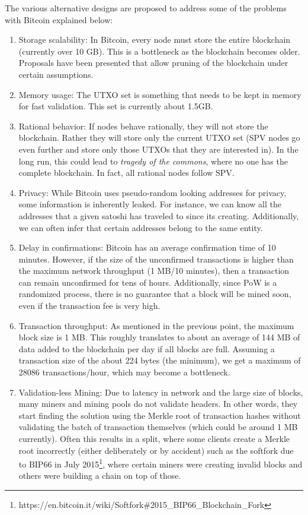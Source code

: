 \documentclass[]{report}   %
\begin{document}
The various alternative designs are proposed to address some of the problems with Bitcoin explained below:
\begin{enumerate}
	\item Storage scalability: In Bitcoin, every node must store the entire blockchain (currently over 10 GB). This is a bottleneck as the blockchain becomes older. Proposals have been presented that allow pruning of the blockchain under certain assumptions. 
	\item Memory usage: The UTXO set is something that needs to be kept in memory for fast validation. This set is currently about 1.5GB.
	\item Rational behavior: If nodes behave rationally, they will not store the blockchain. Rather they will store only the current UTXO set (SPV nodes go even further and store only those UTXOs that they are interested in). In the long run, this could lead to {\em tragedy of the commons}, where no one has the complete blockchain. In fact, all rational nodes follow SPV.
	\item Privacy: While Bitcoin uses pseudo-random looking addresses for privacy, some information is inherently leaked. For instance, we can know all the addresses that a given satoshi has traveled to since its creating. Additionally, we can often infer that certain addresses belong to the same entity.
	\item Delay in confirmations: Bitcoin has an average confirmation time of 10 minutes. However, if the size of the unconfirmed transactions is higher than the maximum network throughput (1 MB/10 minutes), then a transaction can remain unconfirmed for tens of hours. Additionally, since PoW is a randomized process, there is no guarantee that a block will be mined soon, even if the transaction fee is very high.
	\item Transaction throughput: As mentioned in the previous point, the maximum block size is 1 MB. This roughly translates to about an average of 144 MB of data added to the blockchain per day if all blocks are full. Assuming a transaction size of the about 224 bytes (the minimum), we get a maximum of 28086 transactions/hour, which may become a bottleneck. %
	\item Validation-less Mining: Due to latency in network and the large size of blocks, many miners and mining pools do not validate headers. In other words, they start finding the solution using the Merkle root of transaction hashes without validating the batch of transaction themselves (which could be around 1 MB currently). Often this results in a split, where some clients create a Merkle root incorrectly (either deliberately or by accident) such as the softfork due to BIP66 in July 2015\footnote{https://en.bitcoin.it/wiki/Softfork\#2015\_BIP66\_Blockchain\_Fork}, where certain miners were creating invalid blocks and others were building a chain on top of those.

\end{enumerate}
\end{document}
